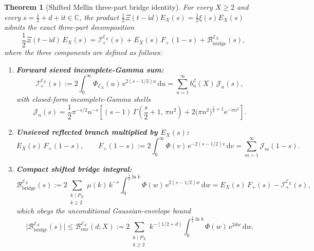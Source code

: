 \documentclass[11pt,reqno]{amsart}
\theoremstyle{plain}
\newtheorem{theorem}{Theorem}[section]
\theoremstyle{definition}
\theoremstyle{remark}
\numberwithin{equation}{section}
\newcommand{\dd}{\,\mathrm{d}}
\newcommand{\ii}{\mathrm{i}}
\newcommand{\ee}{\mathrm{e}}
\begin{document}
\begin{theorem}[Shifted Mellin three-part bridge identity]\label{thm:bridge_identity}
For every $X \ge 2$ and every $s = \frac{1}{2} + d + \ii t \in \mathbb{C}$, the product $\frac{1}{2}\Xi(t - \ii d)E_X(s) = \frac{1}{2}\xi(s)E_X(s)$ admits the exact three-part decomposition
\begin{equation}\label{eq:boxed_bridge}
\boxed{\;\frac{1}{2}\Xi(t - \ii d)\,E_X(s) = \mathcal{I}_+^{\mathcal{E}_X}(s) + E_X(s)\,F_+(1 - s) + \mathcal{B}_{\mathrm{bridge}}^{\mathcal{E}_X}(s),\;}
\end{equation}
where the three components are defined as follows:
\begin{enumerate}[label=\textup{(\roman*)},leftmargin=2.2em]
\item \textbf{Forward sieved incomplete-Gamma sum:}
\begin{equation}\label{eq:I_plus}
\mathcal{I}_+^{\mathcal{E}_X}(s) := 2\int_0^{\infty} \Phi_{\mathcal{E}_X}(u)\,\ee^{2(s - 1/2)u}\dd u = \sum_{n=1}^{\infty} b_n^{\mathcal{E}}(X)\,\mathcal{J}_n(s),
\end{equation}
with closed-form incomplete-Gamma shells
\begin{equation}\label{eq:J_n_closed}
\mathcal{J}_n(s) = \frac{1}{2}\pi^{-s/2}n^{-s}\left[(s - 1)\,\Gamma\!\left(\frac{s}{2} + 1,\,\pi n^2\right) + 2\bigl(\pi n^2\bigr)^{\frac{s}{2}+1}\ee^{-\pi n^2}\right].
\end{equation}
\item \textbf{Unsieved reflected branch multiplied by $E_X(s)$:}
\begin{equation}\label{eq:refl_branch}
E_X(s)\,F_+(1 - s), \qquad F_+(1 - s) := 2\int_0^{\infty} \Phi(v)\,\ee^{-2(s - 1/2)v}\dd v = \sum_{m=1}^{\infty} \mathcal{J}_m(1 - s).
\end{equation}
\item \textbf{Compact shifted bridge integral:}
\begin{equation}\label{eq:bridge_def}
\mathcal{B}_{\mathrm{bridge}}^{\mathcal{E}_X}(s) := 2\sum_{\substack{k \mid P_X \\ k \ge 2}} \mu(k)\,k^{-s}\int_0^{\frac{1}{2}\ln k} \Phi(w)\,\ee^{2(s - 1/2)w}\dd w = E_X(s)\,F_+(s) - \mathcal{I}_+^{\mathcal{E}_X}(s),
\end{equation}
which obeys the unconditional Gaussian-envelope bound
\begin{equation}\label{eq:bridge_env}
\bigl\lvert\mathcal{B}_{\mathrm{bridge}}^{\mathcal{E}_X}(s)\bigr\rvert \le \mathcal{B}_{\mathrm{env}}^{\mathcal{E}_X}(d; X) := 2\sum_{\substack{k \mid P_X \\ k \ge 2}} k^{-(1/2 + d)}\int_0^{\frac{1}{2}\ln k} \Phi(w)\,\ee^{2dw}\dd w.
\end{equation}
\end{enumerate}
\end{theorem}
\end{document}

